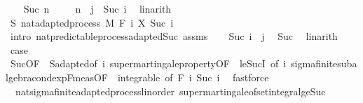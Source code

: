 \begin{isabellebody}
\isanewline
\ \ \isamarkupfalse%
\ {\isacharparenleft}{\kern0pt}Suc\ n{\isacharparenright}{\kern0pt}\isanewline
\ \ \isamarkupfalse%
\ {\isacharasterisk}{\kern0pt}{\isacharcolon}{\kern0pt}\ {\isachardoublequoteopen}n\ {\isacharequal}{\kern0pt}\ j\ {\isacharminus}{\kern0pt}\ Suc\ i{\isachardoublequoteclose}\ \isamarkupfalse%
\ linarith\isanewline
\ \ \isamarkupfalse%
\ S{\isacharcolon}{\kern0pt}\ nat{\isacharunderscore}{\kern0pt}adapted{\isacharunderscore}{\kern0pt}process\ M\ F\ {\isachardoublequoteopen}{\isasymlambda}i{\isachardot}{\kern0pt}\ X\ {\isacharparenleft}{\kern0pt}Suc\ i{\isacharparenright}{\kern0pt}{\isachardoublequoteclose}\ \isamarkupfalse%
\ {\isacharparenleft}{\kern0pt}intro\ nat{\isacharunderscore}{\kern0pt}predictable{\isacharunderscore}{\kern0pt}process{\isachardot}{\kern0pt}adapted{\isacharunderscore}{\kern0pt}Suc\ assms{\isacharparenright}{\kern0pt}\isanewline
\ \ \isamarkupfalse%
\ {\isachardoublequoteopen}Suc\ i\ {\isasymle}\ j{\isachardoublequoteclose}\ \isamarkupfalse%
\ Suc{\isacharparenleft}{\kern0pt}{}{\isacharcomma}{\kern0pt}{}{\isacharparenright}{\kern0pt}\ \isamarkupfalse%
\ linarith\isanewline
\ \ \isamarkupfalse%
\ {\isacharquery}{\kern0pt}case\ \isamarkupfalse%
\ Suc{\isacharparenleft}{\kern0pt}{}{\isacharparenright}{\kern0pt}{\isacharbrackleft}{\kern0pt}OF\ {\isacharasterisk}{\kern0pt}{\isacharbrackright}{\kern0pt}\ S{\isachardot}{\kern0pt}adapted{\isacharbrackleft}{\kern0pt}of\ i{\isacharbrackright}{\kern0pt}\ supermartingale{\isacharunderscore}{\kern0pt}property{\isacharbrackleft}{\kern0pt}OF\ {\isacharunderscore}{\kern0pt}\ le{\isacharunderscore}{\kern0pt}SucI{\isacharcomma}{\kern0pt}\ of\ i{\isacharbrackright}{\kern0pt}\ sigma{\isacharunderscore}{\kern0pt}finite{\isacharunderscore}{\kern0pt}subalgebra{\isachardot}{\kern0pt}cond{\isacharunderscore}{\kern0pt}exp{\isacharunderscore}{\kern0pt}F{\isacharunderscore}{\kern0pt}meas{\isacharbrackleft}{\kern0pt}OF\ {\isacharunderscore}{\kern0pt}\ integrable{\isacharcomma}{\kern0pt}\ of\ {\isachardoublequoteopen}F\ i{\isachardoublequoteclose}\ {\isachardoublequoteopen}Suc\ i{\isachardoublequoteclose}{\isacharbrackright}{\kern0pt}\ \isamarkupfalse%
\ fastforce\isanewline
{}\isamarkupfalse%
%
\endisatagproof
{\isafoldproof}%
%
\isadelimproof
\isanewline
%
\endisadelimproof
\ \ \isanewline
{}\isamarkupfalse%
\ {\isacharparenleft}{\kern0pt}\ nat{\isacharunderscore}{\kern0pt}sigma{\isacharunderscore}{\kern0pt}finite{\isacharunderscore}{\kern0pt}adapted{\isacharunderscore}{\kern0pt}process{\isacharunderscore}{\kern0pt}linorder{\isacharparenright}{\kern0pt}\ supermartingale{\isacharunderscore}{\kern0pt}of{\isacharunderscore}{\kern0pt}set{\isacharunderscore}{\kern0pt}integral{\isacharunderscore}{\kern0pt}ge{\isacharunderscore}{\kern0pt}Suc{\isacharcolon}{\kern0pt}\isanewline

\end{isabellebody}
